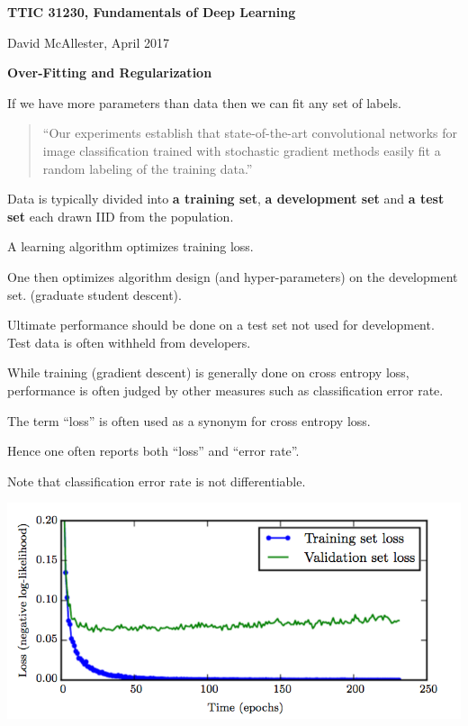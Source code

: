 





{\Huge


\centerline{\bf TTIC 31230, Fundamentals of Deep Learning}
\bigskip
\centerline{David McAllester, April 2017}

\vfill
\centerline{\bf Over-Fitting and Regularization}
\vfill
\vfill

\centerline{}

If we have more parameters than data then we can fit any set of labels.

\vfill
\begin{quotation}
``Our experiments establish that state-of-the-art convolutional networks
for image classification trained with stochastic gradient methods easily fit a random
labeling of the training data.''
\end{quotation}

\vfill
{}



Data is typically divided into {\bf a training set}, {\bf a development set} and {\bf a test set} each drawn IID from the population.

\vfill
A learning algorithm optimizes training loss.

\vfill
One then optimizes algorithm design (and hyper-parameters) on the development set. (graduate student descent).

\vfill
Ultimate performance should be done on a test set not used for development.  Test data is often withheld from developers.

While training (gradient descent) is generally done on cross entropy loss, performance is often judged by other measures such as classification error rate.

\vfill
The term ``loss'' is often used as a synonym for cross entropy loss.

\vfill
Hence one often reports both ``loss'' and ``error rate''.

\vfill
Note that classification error rate is not differentiable.



\centerline{\includegraphics[width = 6in]{../images/EarlyStopping}}

}
